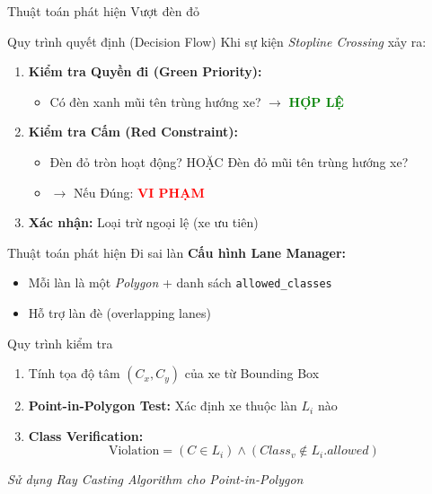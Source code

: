 \begin{frame}{Thuật toán phát hiện Vượt đèn đỏ}
    \begin{block}{Quy trình quyết định (Decision Flow)}
    Khi sự kiện \textit{Stopline Crossing} xảy ra:
    \begin{enumerate}
        \item \textbf{Kiểm tra Quyền đi (Green Priority):}
        \begin{itemize}
            \item Có đèn xanh mũi tên trùng hướng xe? $\rightarrow$ \textcolor{green}{\textbf{HỢP LỆ}}
        \end{itemize}

        \item \textbf{Kiểm tra Cấm (Red Constraint):}
        \begin{itemize}
            \item Đèn đỏ tròn hoạt động? HOẶC Đèn đỏ mũi tên trùng hướng xe?
            \item $\rightarrow$ Nếu Đúng: \textcolor{red}{\textbf{VI PHẠM}}
        \end{itemize}

        \item \textbf{Xác nhận:} Loại trừ ngoại lệ (xe ưu tiên)
    \end{enumerate}
    \end{block}
\end{frame}

\begin{frame}{Thuật toán phát hiện Đi sai làn}
    \textbf{Cấu hình Lane Manager:}
    \begin{itemize}
        \item Mỗi làn là một \textit{Polygon} + danh sách \texttt{allowed\_classes}
        \item Hỗ trợ làn đè (overlapping lanes)
    \end{itemize}

    \begin{block}{Quy trình kiểm tra}
    \begin{enumerate}
        \item Tính tọa độ tâm $(C_x, C_y)$ của xe từ Bounding Box
        \item \textbf{Point-in-Polygon Test:} Xác định xe thuộc làn $L_i$ nào
        \item \textbf{Class Verification:}
        $$ \text{Violation} = (C \in L_i) \land (Class_v \notin L_i.allowed) $$
    \end{enumerate}
    \end{block}

    \textit{Sử dụng Ray Casting Algorithm cho Point-in-Polygon}
\end{frame}

